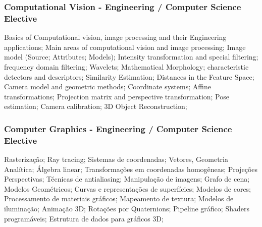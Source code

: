 \subsubsection{Computational Vision - Engineering / Computer Science Elective}
Basics of Computational vision, image processing and their Engineering applications; Main areas of computational vision and image processing; Image model (Source; Attributes; Models); Intensity transformation and special filtering; frequency domain filtering; Wavelets; Mathematical Morphology; characteristic detectors and descriptors; Similarity Estimation; Distances in the Feature Space; Camera model and geometric methods; Coordinate systems; Affine transformations; Projection matrix and perspective transformation; Pose estimation; Camera calibration; 3D Object Reconstruction; 

\subsubsection{Computer Graphics - Engineering / Computer Science Elective}
Rasterização; Ray tracing; Sistemas de coordenadas; Vetores, Geometria Analítica; Álgebra linear; Transformações em coordenadas homogêneas; Projeções Perspectivas; Técnicas de antialiasing; Manipulação de imagens; Grafo de cena; Modelos Geométricos; Curvas e representações de superfícies; Modelos de cores; Processamento de materiais gráficos; Mapeamento de textura; Modelos de iluminação; Animação 3D; Rotações por Quaternions; Pipeline gráfico; Shaders programáveis; Estrutura de dados para gráficos 3D;


\newpage

